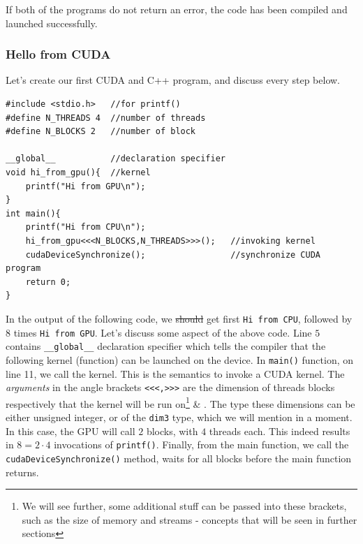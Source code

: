 \vspace{-0.4cm}
If both of the programs do not return an error, the code has been compiled and launched successfully.

\subsubsection{Hello from CUDA}
Let's create our first CUDA and C++ program, and discuss every step below. 
\begin{verbatim}
#include <stdio.h>   //for printf()
#define N_THREADS 4  //number of threads
#define N_BLOCKS 2   //number of block

__global__           //declaration specifier 
void hi_from_gpu(){  //kernel
    printf("Hi from GPU\n");
}
int main(){
    printf("Hi from CPU\n");
    hi_from_gpu<<<N_BLOCKS,N_THREADS>>>();   //invoking kernel
    cudaDeviceSynchronize();                 //synchronize CUDA program
    return 0;
}
\end{verbatim}

In the output of the following code, we \sout{should} get first \verb|Hi from CPU|, 
followed by 8 times \verb|Hi from GPU|. Let's discuss some aspect of the above code.
Line $5$ contains \verb|__global__| declaration specifier which tells 
the compiler that the following kernel (function) can be launched on the device.
In \verb|main()| function, on line 11, we call the kernel. This is the semantics to 
invoke a CUDA kernel. The \textit{arguments} in the angle brackets \verb|<<<,>>>| 
are the dimension of threads blocks respectively that the kernel will be run on\footnote{We will see further, some additional stuff can be passed
into these brackets, such as the size of memory and streams - concepts that will be seen in further sections
} \& . The type these dimensions can be either unsigned integer, or of the \verb|dim3| type, which we will mention in a moment. In this case, 
the GPU will call $2$ blocks, with $4$ threads each. This indeed results in 
$8 = 2\cdot 4$ invocations of \verb|printf()|. Finally, from the main function, we call 
the \verb|cudaDeviceSynchronize()| method, waits for all blocks before the main 
function returns.


